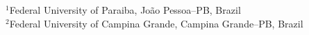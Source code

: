 \documentclass[
    article,
    12pt,
    oneside,
    a4paper,
    english
]{abntex2}
\begin{document}
\frenchspacing

\maketitle

\begin{center}
    {\normalsize
    $^{1}$Federal University of Paraiba, Jo\~ao Pessoa--PB, Brazil\\
    $^{2}$Federal University of Campina Grande, Campina Grande--PB, Brazil}
\end{center}
\vspace{\onelineskip}



\textual







\postextual


\end{document}
